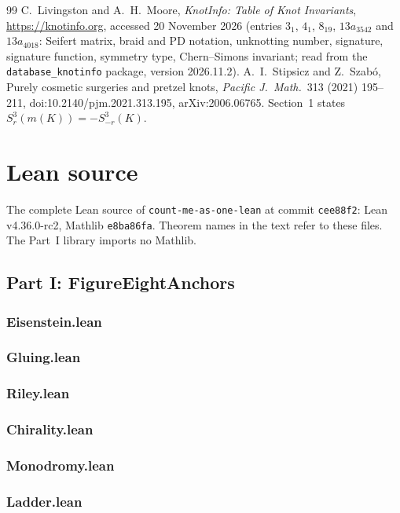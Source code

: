 \documentclass[11pt]{article}
\theoremstyle{definition}
\begin{document}
\begin{thebibliography}{99}
 C.~Livingston and A.~H.~Moore, \emph{KnotInfo: Table of Knot Invariants}, \url{https://knotinfo.org}, accessed 20 November 2026 (entries $3_1$, $4_1$, $8_{19}$, $13a_{3542}$ and $13a_{4018}$: Seifert matrix, braid and PD notation, unknotting number, signature, signature function, symmetry type, Chern--Simons invariant; read from the \texttt{database\_knotinfo} package, version 2026.11.2).
 A.~I.~Stipsicz and Z.~Szab\'o, Purely cosmetic surgeries and pretzel knots, \emph{Pacific J.\ Math.}\ 313 (2021) 195--211, doi:10.2140/pjm.2021.313.195, arXiv:2006.06765. Section~1 states $S^3_r(m(K))=-S^3_{-r}(K)$.
\end{thebibliography}

\appendix
\section{Lean source}
The complete Lean source of \texttt{count-me-as-one-lean} at commit \texttt{cee88f2}: Lean v4.36.0-rc2, Mathlib \texttt{e8ba86fa}. Theorem names in the text refer to these files. The Part~I library imports no Mathlib.
\subsection*{Part I: FigureEightAnchors}
\subsubsection*{Eisenstein.lean}
\subsubsection*{Gluing.lean}
\subsubsection*{Riley.lean}
\subsubsection*{Chirality.lean}
\subsubsection*{Monodromy.lean}
\subsubsection*{Ladder.lean}
\end{document}
